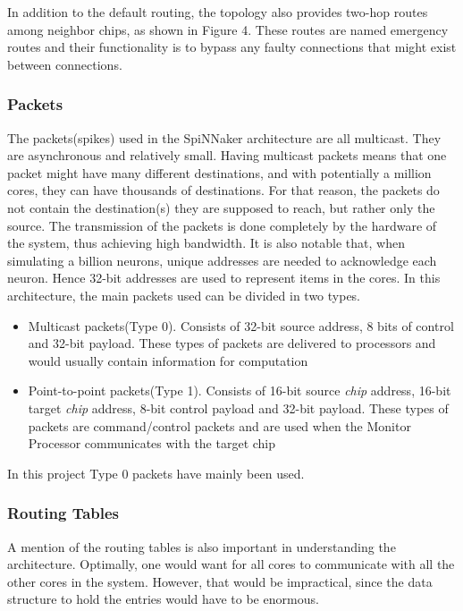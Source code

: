 \documentclass[12pt,a4paper]{article}
\begin{document}
In addition to the default routing, the topology also provides two-hop routes among neighbor chips, as shown in Figure 4. These routes are named emergency routes and their functionality is to bypass any faulty connections that might exist between connections\cite{navaridas2009understanding}\cite{plana2007gals}.

\subsubsection{Packets}
The packets(spikes) used in the SpiNNaker architecture are all multicast. They are asynchronous and relatively small. Having multicast packets means that one packet might have many different destinations, and with potentially a million cores, they can have thousands of destinations. For that reason, the packets do not contain the destination(s) they are supposed to reach, but rather only the source. The transmission of the packets is done completely by the hardware of the system, thus achieving high bandwidth\cite{spinnweb}\cite{navaridas2009understanding}. It is also notable that, when simulating a billion neurons, unique addresses are needed to acknowledge each neuron. Hence 32-bit addresses are used to represent items in the cores. In this architecture, the main packets used can be divided in two types.
\begin{itemize}
\item Multicast packets(Type 0). Consists of 32-bit source address, 8 bits of control and 32-bit payload. These types of packets are delivered to processors and would usually contain information for computation
\item Point-to-point packets(Type 1). Consists of 16-bit source \emph{chip} address, 16-bit target \emph{chip} address, 8-bit control payload and 32-bit payload. These types of packets are command/control packets and are used when the Monitor Processor communicates with the target chip\cite{docfile}
\end{itemize}

In this project Type 0 packets have mainly been used.
\subsubsection{Routing Tables}
A mention of the routing tables is also important in understanding the architecture. Optimally, one would want for all cores to communicate with all the other cores in the system. However, that would be impractical, since the data structure to hold the entries would have to be enormous.
\end{document}
